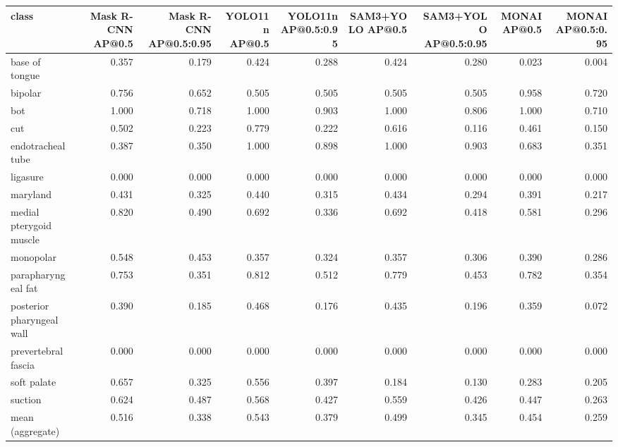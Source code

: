 \begin{tabular}{lrrrrrrrr}
\toprule
class & Mask R-CNN AP@0.5 & Mask R-CNN AP@0.5:0.95 & YOLO11n AP@0.5 & YOLO11n AP@0.5:0.95 & SAM3+YOLO AP@0.5 & SAM3+YOLO AP@0.5:0.95 & MONAI AP@0.5 & MONAI AP@0.5:0.95 \\
\midrule
base of tongue & 0.357 & 0.179 & 0.424 & 0.288 & 0.424 & 0.280 & 0.023 & 0.004 \\
bipolar & 0.756 & 0.652 & 0.505 & 0.505 & 0.505 & 0.505 & 0.958 & 0.720 \\
bot & 1.000 & 0.718 & 1.000 & 0.903 & 1.000 & 0.806 & 1.000 & 0.710 \\
cut & 0.502 & 0.223 & 0.779 & 0.222 & 0.616 & 0.116 & 0.461 & 0.150 \\
endotracheal tube & 0.387 & 0.350 & 1.000 & 0.898 & 1.000 & 0.903 & 0.683 & 0.351 \\
ligasure & 0.000 & 0.000 & 0.000 & 0.000 & 0.000 & 0.000 & 0.000 & 0.000 \\
maryland & 0.431 & 0.325 & 0.440 & 0.315 & 0.434 & 0.294 & 0.391 & 0.217 \\
medial pterygoid muscle & 0.820 & 0.490 & 0.692 & 0.336 & 0.692 & 0.418 & 0.581 & 0.296 \\
monopolar & 0.548 & 0.453 & 0.357 & 0.324 & 0.357 & 0.306 & 0.390 & 0.286 \\
parapharyngeal fat & 0.753 & 0.351 & 0.812 & 0.512 & 0.779 & 0.453 & 0.782 & 0.354 \\
posterior pharyngeal wall & 0.390 & 0.185 & 0.468 & 0.176 & 0.435 & 0.196 & 0.359 & 0.072 \\
prevertebral fascia & 0.000 & 0.000 & 0.000 & 0.000 & 0.000 & 0.000 & 0.000 & 0.000 \\
soft palate & 0.657 & 0.325 & 0.556 & 0.397 & 0.184 & 0.130 & 0.283 & 0.205 \\
suction & 0.624 & 0.487 & 0.568 & 0.427 & 0.559 & 0.426 & 0.447 & 0.263 \\
\midrule
mean (aggregate) & 0.516 & 0.338 & 0.543 & 0.379 & 0.499 & 0.345 & 0.454 & 0.259 \\
\bottomrule
\end{tabular}
